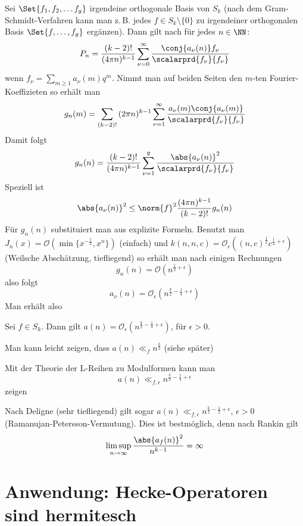 Sei $\Set{f_1, f_2, \ldots f_g}$ irgendeine orthogonale Basis von $S_k$ (nach dem Gram-Schmidt-Verfahren kann man z.\,B. jedes $f\in S_k\setminus\{0\}$ zu irgendeiner orthogonalen Basis $\Set{f, \ldots, f_g}$ ergänzen).
Dann gilt nach  für jedes $n\in\NN$:
\[
	P_n = \frac{(k-2)!}{(4\pi n)^{k-1}} \sum_{\nu = 0}^\infty \frac{\conj{a_\nu(n)}f_\nu}{\scalarprd{f_\nu}{f_\nu}}
\]
wenn $f_\nu = \sum_{m\geq 1} a_\nu(m) q^m$.
Nimmt man auf beiden Seiten den $m$-ten Fourier-Koeffizieten so erhält man
\[
	g_n(m) = \sum_{(k-2)!}{(2\pi n)^{k-1}} \sum_{\nu=1}^\infty \frac{a_\nu(m) \conj{a_\nu(m)}}{\scalarprd{f_\nu}{f_\nu}}
\]
Damit folgt
\[
	g_n(n) = \frac{(k-2)!}{(4\pi n)^{k-1}} \sum_{\nu = 1}^g \frac{\abs{a_\nu(n)}^2}{\scalarprd{f_\nu}{f_\nu}}
\]
Speziell ist
\[
	\abs{a_\nu(n)}^2 \leq \norm{f}^2 \frac{(4\pi n)^{k-1}}{(k-2)!} g_n(n)
\]
Für $g_n(n)$ substituiert man aus  explizite Formeln. Benutzt man $J_n(x) = \mathcal{O}(\min \{x^{-\frac{1}{2}}, x^n\})$ (einfach) und $k(n,n,c) = \mathcal{O}_\epsilon( (n,c)^{\frac{1}{2}}c^{\frac{1}{2}+\epsilon})$ (Weilsche Abschätzung, tiefliegend) so erhält man nach einigen Rechnungen
\[
	g_n(n) = \mathcal{O} (n^{\frac{1}{2}+\epsilon})
\]
also folgt
\[
	a_\nu(n) = \mathcal{O}_\epsilon(n^{\frac{k}{2}-\frac{1}{4} + \epsilon} )
\]
Man erhält also 
\begin{satz}
	Sei $f \in S_k$. Dann gilt $a(n) = \mathcal{O}_\epsilon (n^{\frac{k}{2}-\frac{1}{4} + \epsilon})$, für $\epsilon > 0$.
\end{satz}

\begin{beme-list}
	\item Man kann leicht zeigen, dass $a(n) \ll_f n^{\frac{k}{2}}$ (siehe später)
	\item Mit der Theorie der L-Reihen zu Modulformen kann man
	\[
		a(n) \ll_{f,\epsilon} n^{\frac{k}{2} - \frac{1}{4} + \epsilon}
	\]
	zeigen
	\item Nach Deligne (sehr tiefliegend) gilt sogar $a(n) \ll_{f,\epsilon} n^{\frac{k}{2}-\frac{1}{2}+\epsilon}$, $\epsilon > 0$ (Ramanujan-Petersson-Vermutung).
	Dies ist bestmöglich, denn nach Rankin gilt
	\[
		\limsup_{n\to\infty} \frac{\abs{a_f(n)}^2}{n^{k-1}} = \infty
	\]
	
\end{beme-list}

\section{Anwendung: Hecke-Operatoren sind hermitesch}

